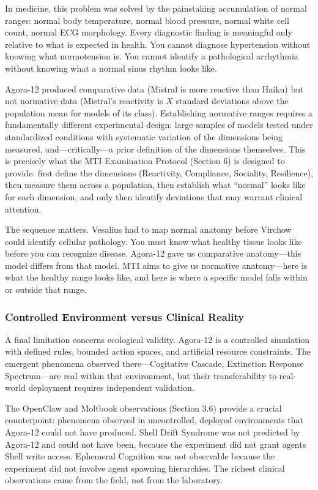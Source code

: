 \documentclass[11pt]{article}
\begin{document}
In medicine, this problem was solved by the painstaking accumulation of normal ranges: normal body temperature, normal blood pressure, normal white cell count, normal ECG morphology. Every diagnostic finding is meaningful only relative to what is expected in health. You cannot diagnose hypertension without knowing what normotension is. You cannot identify a pathological arrhythmia without knowing what a normal sinus rhythm looks like.

Agora-12 produced comparative data (Mistral is more reactive than Haiku) but not normative data (Mistral's reactivity is $X$ standard deviations above the population mean for models of its class). Establishing normative ranges requires a fundamentally different experimental design: large samples of models tested under standardized conditions with systematic variation of the dimensions being measured, and---critically---a prior definition of the dimensions themselves. This is precisely what the MTI Examination Protocol (Section 6) is designed to provide: first define the dimensions (Reactivity, Compliance, Sociality, Resilience), then measure them across a population, then establish what ``normal'' looks like for each dimension, and only then identify deviations that may warrant clinical attention.

The sequence matters. Vesalius had to map normal anatomy before Virchow could identify cellular pathology. You must know what healthy tissue looks like before you can recognize disease. Agora-12 gave us comparative anatomy---this model differs from that model. MTI aims to give us normative anatomy---here is what the healthy range looks like, and here is where a specific model falls within or outside that range.

\subsubsection{Controlled Environment versus Clinical Reality}

A final limitation concerns ecological validity. Agora-12 is a controlled simulation with defined rules, bounded action spaces, and artificial resource constraints. The emergent phenomena observed there---Cogitative Cascade, Extinction Response Spectrum---are real within that environment, but their transferability to real-world deployment requires independent validation.

The OpenClaw and Moltbook observations (Section 3.6) provide a crucial counterpoint: phenomena observed in uncontrolled, deployed environments that Agora-12 could not have produced. Shell Drift Syndrome was not predicted by Agora-12 and could not have been, because the experiment did not grant agents Shell write access. Ephemeral Cognition was not observable because the experiment did not involve agent spawning hierarchies. The richest clinical observations came from the field, not from the laboratory.
\end{document}
